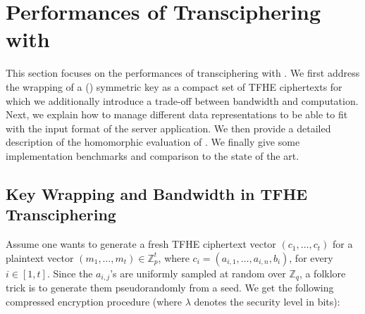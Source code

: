 


\section{Performances of Transciphering with \coolName}
\label{sec:bench}

This section focuses on the performances of transciphering with \coolName. We first address the wrapping of a (\coolName) symmetric key as a compact set of TFHE ciphertexts for which we additionally introduce a trade-off between bandwidth and computation. Next, we explain how to manage different data representations to be able to fit with the input format of the server application. We then provide a detailed description of the homomorphic evaluation of \coolName. We finally give some implementation benchmarks and comparison to the state of the art.

\subsection{Key Wrapping and Bandwidth in TFHE Transciphering} \label{sec:key_wrapping}

Assume one wants to generate a fresh TFHE ciphertext vector $(c_1, \ldots, c_t)$ for a plaintext vector $(m_1, \ldots, m_t) \in \mathbb{Z}_p^t$, where $c_i = (a_{i,1}, \ldots, a_{i,n}, b_i)$, for every $i \in [1,t]$. Since the $a_{i,j}$'s are uniformly sampled at random over $\mathbb{Z}_q$, a folklore trick is to generate them pseudorandomly from a seed. We get the following compressed encryption procedure (where $\lambda$ denotes the security level in bits):
\ifeprint
  
\begin{center}
\noindent{}
\end{center}

